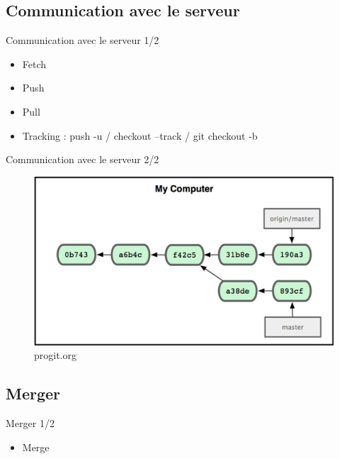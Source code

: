 \documentclass{beamer}
\begin{document}
\subsection*{Communication avec le serveur}
\begin{frame}{Communication avec le serveur 1/2}
  \begin{itemize}
  \item Fetch
  \item Push
  \item Pull
  \item Tracking : push -u / checkout --track / git checkout -b
  \end{itemize}
\end{frame}

\begin{frame}{Communication avec le serveur 2/2}
  \begin{figure}
    \begin{center}
      \includegraphics[scale=0.7]{img/RemoteBranch.png}
    \end{center}
    \caption{progit.org}
  \end{figure}
\end{frame}

\subsection*{Merger}
\begin{frame}{Merger 1/2}
  \begin{itemize}
  \item Merge
  \end{itemize}
\end{frame}
\end{document}
